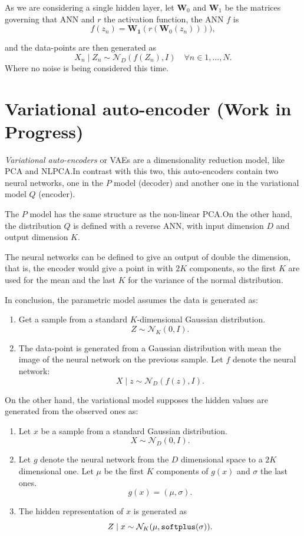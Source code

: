 As we are considering a single hidden layer, let \(\bm{W}_{0}\) and \(\bm{W}_{1}\) be the matrices governing that ANN and \(r\) the activation function, the ANN \(f\) is
\[
  f(z_{n}) = \bm{W_{1}}(r(\bm{W}_{0}(z_{n})))),
\]

and the data-points are then generated as
\[
  X_{n}\mid Z_{n} \sim \mathcal{N}_{D}(f(Z_{n}), I) \quad \forall n \in 1,\dots,N.
\]
Where no noise is being considered this time.

\section{Variational auto-encoder (Work in Progress)}

\emph{Variational auto-encoders} or VAEs are a dimensionality reduction model, like PCA and NLPCA.\@ In contrast with this two, this auto-encoders contain two neural networks, one in the \(P\) model (decoder) and another one in the variational model \(Q\) (encoder).

The \(P\) model has the same structure as the non-linear PCA.\@ On the other hand, the  distribution \(Q\) is defined with a reverse ANN, with input dimension \(D\) and output dimension \(K\).

The neural networks can be defined to give an output of double the dimension, that is, the encoder would give a point in with \( 2K \) components, so the first \( K \) are used for the mean and the last \( K \) for the variance of the normal distribution.

In conclusion, the parametric model assumes the data is generated as:
\begin{enumerate}
  \item Get a sample from a standard \(K\)-dimensional Gaussian distribution.
    \[
    Z \sim \mathcal{N}_{K}(0,I).
    \]
  \item The data-point is generated from a Gaussian distribution with mean the image of the neural network on the previous sample. Let \(f\) denote the neural network:
    \[
    X \mid z \sim \mathcal{N}_{D}(f(z), I).
    \]
\end{enumerate}
On the other hand, the variational model supposes the hidden values are generated from the observed ones as:
\begin{enumerate}
  \item Let \(x\) be a sample from a standard Gaussian distribution.
    \[
    X \sim \mathcal{N}_{D}(0,I).
    \]
  \item Let \(g\) denote the neural network from the \(D\) dimensional space to a \(2K\) dimensional one. Let \(\mu\) be the first \(K\) components of \(g(x)\) and \(\sigma\) the last ones.
    \[
    g(x) = (\mu, \sigma).
    \]
  \item The hidden representation of \(x\) is generated as
    \[
    Z \mid x \sim \mathcal{N}_{K}(\mu, \text{\texttt{softplus}}(\sigma)).
    \]
\end{enumerate}

